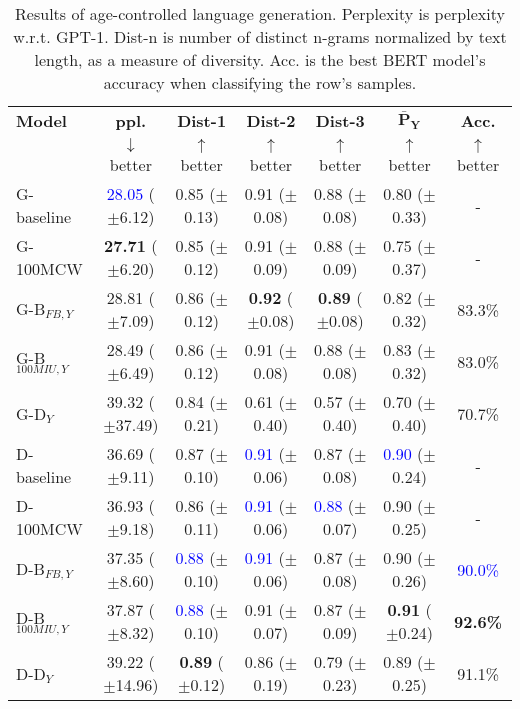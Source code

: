 \begin{table*}[h]
    \centering
    \begin{tabular}{l | c c c c | c c}
    \toprule
    \textbf{Model} & \textbf{ppl.} & \textbf{Dist-1} & \textbf{Dist-2} & \textbf{Dist-3} & $\boldsymbol{\bar{P}_Y}$ & \textbf{Acc.}\\
     & $\downarrow$ better & $\uparrow$ better & $\uparrow$ better & $\uparrow$ better & $\uparrow$ better & $\uparrow$ better\\
    \midrule
    \midrule
    G-baseline & \textcolor{blue}{28.05} ($\pm$6.12) & 0.85 ($\pm$0.13) & 0.91 ($\pm$0.08) & 0.88 ($\pm$0.08) & 0.80 ($\pm$0.33) & -\\
    G-100MCW & \textbf{27.71} ($\pm$6.20) & 0.85 ($\pm$0.12) & 0.91 ($\pm$0.09) & 0.88 ($\pm$0.09) & 0.75 ($\pm$0.37) & -\\
    \midrule
    G-B$_{FB, Y}$ & 28.81 ($\pm$7.09) & 0.86 ($\pm$0.12) & \textbf{0.92} ($\pm$0.08) & \textbf{0.89} ($\pm$0.08) & 0.82 ($\pm$0.32) & 83.3\%\\
    G-B$_{100MIU, Y}$ & 28.49 ($\pm$6.49) & 0.86 ($\pm$0.12) & 0.91 ($\pm$0.08) & 0.88 ($\pm$0.08) & 0.83 ($\pm$0.32) & 83.0\%\\
    \midrule
    G-D$_{Y}$ & 39.32 ($\pm$37.49) & 0.84 ($\pm$0.21) & 0.61 ($\pm$0.40) & 0.57 ($\pm$0.40) & 0.70 ($\pm$0.40) & 70.7\%\\
    \midrule
    \midrule
    D-baseline & 36.69 ($\pm$9.11) & 0.87 ($\pm$0.10) & \textcolor{blue}{0.91} ($\pm$0.06) & 0.87 ($\pm$0.08) & \textcolor{blue}{0.90} ($\pm$0.24) & -\\
    D-100MCW & 36.93 ($\pm$9.18) & 0.86 ($\pm$0.11) & \textcolor{blue}{0.91} ($\pm$0.06) & \textcolor{blue}{0.88} ($\pm$0.07) & 0.90 ($\pm$0.25) & -\\
    \midrule
    D-B$_{FB, Y}$ & 37.35 ($\pm$8.60) & \textcolor{blue}{0.88} ($\pm$0.10) & \textcolor{blue}{0.91} ($\pm$0.06) & 0.87 ($\pm$0.08) & 0.90 ($\pm$0.26) & \textcolor{blue}{90.0\%}\\
    D-B$_{100MIU, Y}$ & 37.87 ($\pm$8.32) & \textcolor{blue}{0.88} ($\pm$0.10) & 0.91 ($\pm$0.07) & 0.87 ($\pm$0.09) & \textbf{0.91} ($\pm$0.24) & \textbf{92.6\%}\\
    \midrule
    D-D$_{Y}$ & 39.22 ($\pm$14.96) & \textbf{0.89} ($\pm$0.12) & 0.86 ($\pm$0.19) & 0.79 ($\pm$0.23) & 0.89 ($\pm$0.25) & 91.1\%\\
    \bottomrule
    \end{tabular}
    \caption{ Results of age-controlled language generation. Perplexity is perplexity w.r.t. GPT-1. Dist-n is number of distinct n-grams normalized by text length, as a measure of diversity. Acc. is the best BERT model's accuracy when classifying the row's samples.}
    \label{tab:ctg_results_ws_young_prompt_young_model}
\end{table*}

